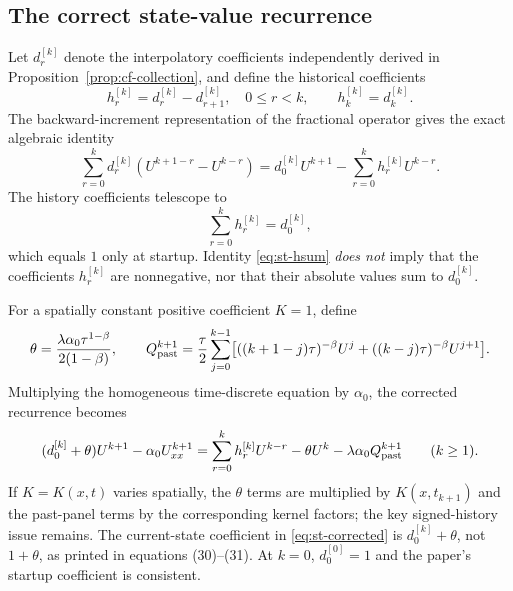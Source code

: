 \documentclass[11pt,a4paper]{amsart}
\theoremstyle{remark}
\theoremstyle{plain}
\theoremstyle{remark}
\numberwithin{equation}{section}
\begin{document}
\subsection{The correct state-value recurrence}
Let $d_r^{[k]}$ denote the interpolatory coefficients independently derived in Proposition~\ref{prop:cf-collection}, and define the historical coefficients
\begin{equation}\label{eq:st-history}
 h_r^{[k]}=d_r^{[k]}-d_{r+1}^{[k]},\quad 0\le r<k,
 \qquad h_k^{[k]}=d_k^{[k]}.
\end{equation}
The backward-increment representation of the fractional operator gives the exact algebraic identity
\begin{equation}\label{eq:st-state}
 \sum_{r=0}^k d_r^{[k]}(U^{k+1-r}-U^{k-r})
 =d_0^{[k]}U^{k+1}-\sum_{r=0}^k h_r^{[k]}U^{k-r}.
\end{equation}
The history coefficients telescope to
\begin{equation}\label{eq:st-hsum}
 \sum_{r=0}^k h_r^{[k]}=d_0^{[k]},
\end{equation}
which equals $1$ only at startup. Identity \eqref{eq:st-hsum} \emph{does not} imply that the coefficients $h_r^{[k]}$ are nonnegative, nor that their absolute values sum to $d_0^{[k]}$.

For a spatially constant positive coefficient $K=1$, define
\[
 \theta=\frac{\lambda\alpha_0\tau^{1-\beta}}{2(1-\beta)},\qquad
 Q_{\rm past}^{k+1}=\frac{\tau}{2}\sum_{j=0}^{k-1}
 \bigl[((k+1-j)\tau)^{-\beta}U^j+((k-j)\tau)^{-\beta}U^{j+1}\bigr].
\]
Multiplying the homogeneous time-discrete equation by $\alpha_0$, the corrected recurrence becomes
\begin{equation}\label{eq:st-corrected}
 (d_0^{[k]}+\theta)U^{k+1}-\alpha_0 U_{xx}^{k+1}
 =\sum_{r=0}^k h_r^{[k]}U^{k-r}
 -\theta U^k-\lambda\alpha_0 Q_{\rm past}^{k+1}
 \qquad (k\ge1).
\end{equation}
If $K=K(x,t)$ varies spatially, the $\theta$ terms are multiplied by $K(x,t_{k+1})$ and the past-panel terms by the corresponding kernel factors; the key signed-history issue remains. The current-state coefficient in \eqref{eq:st-corrected} is $d_0^{[k]}+\theta$, not $1+\theta$, as printed in equations (30)--(31). At $k=0$, $d_0^{[0]}=1$ and the paper's startup coefficient is consistent.
\end{document}
